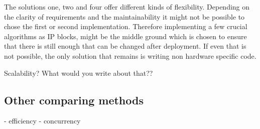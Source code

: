 \documentclass[conference]{IEEEtran}
\begin{document}
The solutions one, two and four offer different kinds of flexibility. Depending on the clarity of requirements and the maintainability it might not be possible to chose the first or second implementation. Therefore implementing a few crucial algorithms as IP blocks, might be the middle ground which is chosen to ensure that there is still enough that can be changed after deployment. If even that is not possible, the only solution that remains is writing non hardware specific code.

Scalability? What would you write about that??

\subsection{Other comparing methods}
- efficiency
- concurrency
\end{document}

